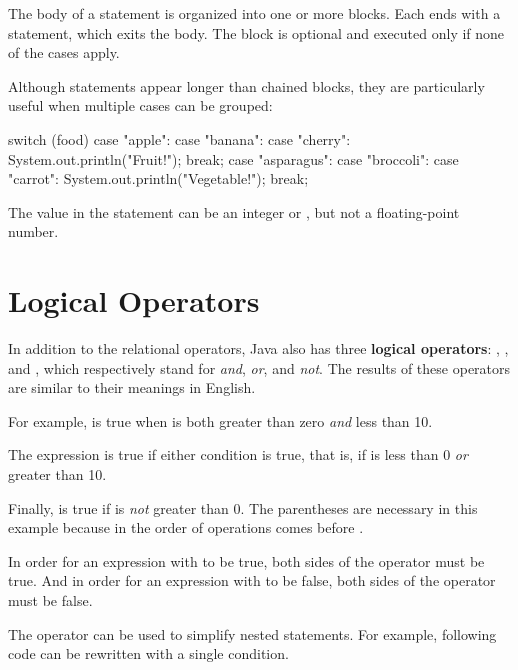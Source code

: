 The body of a  statement is organized into one or more  blocks.
Each  ends with a  statement, which exits the  body.
The  block is optional and executed only if none of the cases apply.

Although  statements appear longer than chained  blocks, they are particularly useful when multiple cases can be grouped:

\begin{code}
switch (food) {
    case "apple":
    case "banana":
    case "cherry":
        System.out.println("Fruit!");
        break;
    case "asparagus":
    case "broccoli":
    case "carrot":
        System.out.println("Vegetable!");
        break;
}
\end{code}

The value in the  statement can be an integer or , but not a floating-point number.


\section{Logical Operators}


In addition to the relational operators, Java also has three {\bf logical operators}: \java{&&}, \java{||}, and \java{!}, which respectively stand for {\em and}, {\em or}, and {\em not}.
The results of these operators are similar to their meanings in English.

For example,  is true when  is both greater than zero {\em and} less than 10.

The expression  is true if either condition is true, that is, if  is less than 0 {\em or} greater than 10.

Finally,  is true if  is {\em not} greater than 0.
The parentheses are necessary in this example because in the order of operations \java{!} comes before \java{>}.

In order for an expression with \java{&&} to be true, both sides of the \java{&&} operator must be true.
And in order for an expression with \java{||} to be false, both sides of the \java{||} operator must be false.

The \java{&&} operator can be used to simplify nested  statements.
For example, following code can be rewritten with a single condition.

